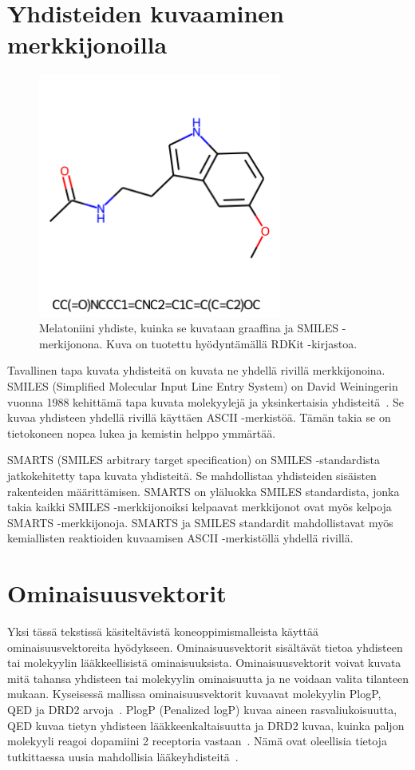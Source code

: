 \documentclass[finnish,twoside,censored,tkt,sw-line]{HYthesisML}
\begin{document}
\section{Yhdisteiden kuvaaminen merkkijonoilla}

\begin{figure}[ht]
    \centering
    \includegraphics[width=8cm, height=8cm]{melatonin-smiles.png}
    \caption{Melatoniini yhdiste, kuinka se kuvataan graaffina ja SMILES -merkijonona.
        Kuva on tuotettu hyödyntämällä RDKit -kirjastoa.}
\end{figure}

Tavallinen tapa kuvata yhdisteitä on kuvata ne yhdellä rivillä merkkijonoina.
SMILES (Simplified Molecular Input Line Entry System) on David Weiningerin vuonna 1988 kehittämä tapa kuvata molekyylejä ja yksinkertaisia yhdisteitä~\cite{WeiningerSMILES}.
Se kuvaa yhdisteen yhdellä rivillä käyttäen ASCII -merkistöä.
Tämän takia se on tietokoneen nopea lukea ja kemistin helppo ymmärtää.

SMARTS (SMILES arbitrary target specification) on SMILES -standardista jatkokehitetty tapa kuvata yhdisteitä.
Se mahdollistaa yhdisteiden sisäisten rakenteiden määrittämisen.
SMARTS on yläluokka SMILES standardista, jonka takia kaikki SMILES -merkkijonoiksi kelpaavat merkkijonot ovat myös kelpoja SMARTS -merkkijonoja.
SMARTS ja SMILES standardit mahdollistavat myös kemiallisten reaktioiden kuvaamisen ASCII -merkistöllä yhdellä rivillä.

\section{Ominaisuusvektorit}

Yksi tässä tekstissä käsiteltävistä koneoppimismalleista käyttää ominaisuusvektoreita hyödykseen.
Ominaisuusvektorit sisältävät tietoa yhdisteen tai molekyylin lääkkeellisistä ominaisuuksista.
Ominaisuusvektorit voivat kuvata mitä tahansa yhdisteen tai molekyylin ominaisuutta ja ne voidaan valita tilanteen mukaan.
Kyseisessä mallissa ominaisuusvektorit kuvaavat molekyylin PlogP, QED ja DRD2 arvoja~\cite{ShinBonggun}.
PlogP (Penalized logP) kuvaa aineen rasvaliukoisuutta, QED kuvaa tietyn yhdisteen lääkkeenkaltaisuutta ja DRD2 kuvaa, kuinka paljon molekyyli reagoi dopamiini 2 receptoria vastaan~\cite{BickertonGRichard2012Qtcb}.
Nämä ovat oleellisia tietoja tutkittaessa uusia mahdollisia lääkeyhdisteitä~\cite{ShinBonggun}.
\end{document}
